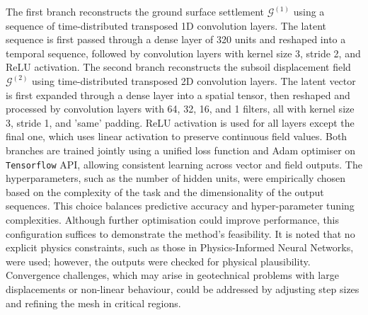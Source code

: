 The first branch reconstructs the ground surface settlement $\mathcal{G}^{(1)}$ using a sequence of time-distributed transposed 1D convolution layers. The latent sequence is first passed through a dense layer of 320 units and reshaped into a temporal sequence, followed by convolution layers with kernel size 3, stride 2, and ReLU activation. The second branch reconstructs the subsoil displacement field $\mathcal{G}^{(2)}$ using time-distributed transposed 2D convolution layers. The latent vector is first expanded through a dense layer into a spatial tensor, then reshaped and processed by convolution layers with 64, 32, 16, and 1 filters, all with kernel size 3, stride 1, and 'same' padding. ReLU activation is used for all layers except the final one, which uses linear activation to preserve continuous field values. Both branches are trained jointly using a unified loss function and Adam optimiser on \texttt{Tensorflow} API, allowing consistent learning across vector and field outputs. The hyperparameters, such as the number of hidden units, were empirically chosen based on the complexity of the task and the dimensionality of the output sequences. This choice balances predictive accuracy and hyper-parameter tuning complexities. Although further optimisation could improve performance, this configuration suffices to demonstrate the method's feasibility. It is noted that no explicit physics constraints, such as those in Physics-Informed Neural Networks, were used; however, the outputs were checked for physical plausibility. Convergence challenges, which may arise in geotechnical problems with large displacements or non-linear behaviour, could be addressed by adjusting step sizes and refining the mesh in critical regions.
